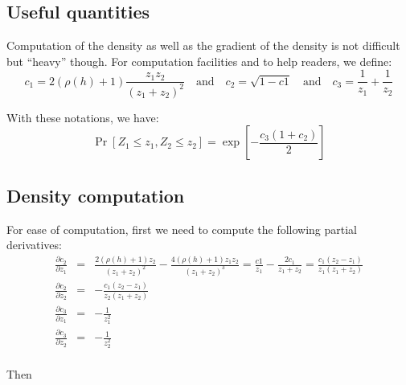 \documentclass{article}
\begin{document}
\subsection{Useful quantities}
\label{sec:usefull-quantities}

Computation of the density as well as the gradient of the density is
not difficult but ``heavy'' though. For computation facilities and to
help readers, we define:
\begin{equation}
  \label{eq:1}
  c_1 = 2 \left(\rho(h) + 1 \right) \frac{z_1z_2}{(z_1+z_2)^2} \quad
  \text{and} \quad c_2 = \sqrt{1 - c1} \quad \text{and} \quad
  c_3 = \frac{1}{z_1} + \frac{1}{z_2}
\end{equation}

With these notations, we have:
\begin{equation*}
  \Pr[Z_1 \leq z_1, Z_2 \leq z_2] = \exp\left[-\frac{c_3 (1 +
    c_2)}{2} \right]
\end{equation*}

\subsection{Density computation}
\label{sec:density-computation}

For ease of computation, first we need to compute the following
partial derivatives:
\begin{eqnarray*}
  \frac{\partial c_2}{\partial z_1} &=& \frac{2
    \left(\rho(h)+1\right)z_2}{(z_1+z_2)^2} - \frac{4
    \left(\rho(h)+1\right)z_1z_2}{(z_1+z_2)^3} =  \frac{c1}{z_1} -
  \frac{2 c_1}{z_1+z_2} = \frac{c_1 (z_2 - z_1)}{z_1 (z_1 + z_2)}\\
  \frac{\partial c_2}{\partial z_2} &=& -\frac{c_1 (z_2 - z_1)}{z_2
    (z_1 + z_2)}\\
  \frac{\partial c_3}{\partial z_1} &=& -\frac{1}{z_1^2}\\
  \frac{\partial c_3}{\partial z_2} &=& -\frac{1}{z_2^2}\\
\end{eqnarray*}

Then
\end{document}
